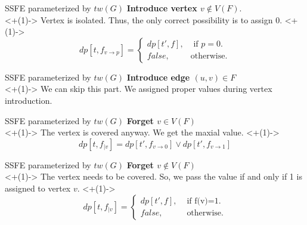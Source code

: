 \documentclass{beamer}
\newcommand{\nextslide}[1]{\onslide<+(1)->{#1}}
\begin{document}
\begin{frame}[t]{SSFE parameterized by $tw(G)$}
\small
\textbf{Introduce vertex $v \notin V(F)$}.\\
\onslide<+(1)->{
Vertex is isolated. Thus, the only correct possibility is to assign 0.
}
\vfill
\large
\onslide<+(1)->{
\begin{equation*}
dp[t,f_{v \rightarrow p}] = \begin{cases}
dp[t',f], &\text{ if $p=0$.} \\
false, &\text{otherwise.}
\end{cases}
\end{equation*}
}
\vfill
\end{frame}

\begin{frame}[t]{SSFE parameterized by $tw(G)$}
\small
\textbf{Introduce edge $(u,v) \in F$}\\
\nextslide{
We can skip this part. We assigned proper values during vertex introduction.
}
\end{frame}

\begin{frame}[t]{SSFE parameterized by $tw(G)$}
\small
\textbf{Forget $v \in V(F)$}\\
\nextslide{
The vertex is covered anyway. We get the maxial value.
}
\vfill
\large
\nextslide{
\begin{equation*}
dp[t,f_{|v}] = dp[t',f_{v \rightarrow 0}] \lor dp[t',f_{v \rightarrow 1}]
\end{equation*}
}
\vfill
\end{frame}

\begin{frame}[t]{SSFE parameterized by $tw(G)$}
\small
\textbf{Forget $v \notin V(F)$}\\
\nextslide{
The vertex needs to be covered. So, we pass the value if and only if 1 is assigned to vertex $v$.
}
\vfill
\large
\nextslide{
\begin{equation*}
dp[t,f_{|v}] = \begin{cases}
dp[t',f], &\text{ if f(v)=1.}\\
false, &\text{ otherwise.}
\end{cases}
\end{equation*}
}
\vfill
\end{frame}
\end{document}
